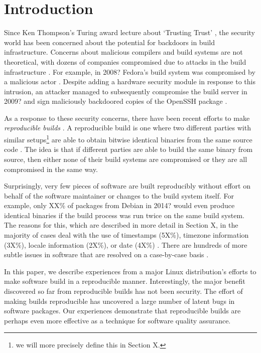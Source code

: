 \section{Introduction}
\label{SEC:introduction}

Since Ken Thompson's Turing award lecture about `Trusting Trust' 
, the security world has been concerned about the potential
for backdoors in build infrastructure.  Concerns about malicious compilers
and build systems are not
theoretical, with dozens of companies compromised due to attacks in the
build infrastructure .  For example, in 2008?
Fedora's build system was compromised by a malicious actor .
Despite adding a hardware security module in response to this intrusion, 
an attacker managed to subsequently compromise the build server in 2009? 
and sign maliciously backdoored copies of the OpenSSH package
.

As a response to these security concerns, there have been recent
efforts to make \emph{reproducible builds} .  A reproducible
build is one where two different parties with similar setups\footnote{we 
will more precisely define this in Section X.} are able 
to obtain bitwise identical binaries from the same source code
.  
The idea is that if different parties are able to build the same binary
from source, then either none of their build systems are compromised or
they are all compromised in the same way.

Surprisingly, very few pieces of software are built reproducibly without
effort on behalf of the software maintainer or changes to the build system
itself.  For example, only XX\% of packages from Debian in 2014? would even
produce identical binaries if the build process was run twice on the same
build system.  The reasons for this, which are described in more detail
in Section X, in the majority of cases deal with the use
of timestamps (5X\%), timezone information (3X\%), locale information
(2X\%), or date (4X\%) .  There are hundreds of
more subtle issues in software that are resolved on a case-by-case basis
.

In this paper, we describe experiences from a major Linux distribution's
efforts to make software build in a reproducible manner.  Interestingly,
the major benefit discovered so far from reproducible builds has not been 
security.  The effort of making builds reproducible has uncovered a large
number of latent bugs in software packages.  Our experiences demonstrate
that reproducible builds are perhaps even more effective as a technique
for software quality assurance.

